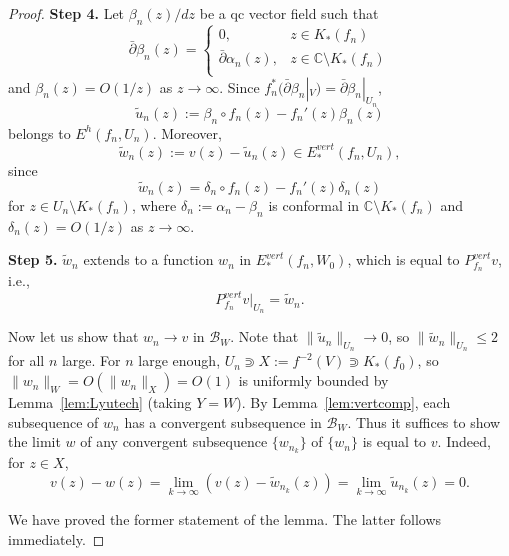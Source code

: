 \documentclass{amsart}
\numberwithin{equation}{section}
\newcommand{\C}{\mathbb C}
\theoremstyle{definition}
\theoremstyle{remark}
\begin{document}
\begin{proof}
{\bf Step 4.} Let $\beta_n(z)/dz$ be a qc vector field such that
\[ \bar{\partial} \beta_n(z)=
\begin{cases}
0, & z\in K_*(f_n)\\
\bar{\partial} \alpha_n(z),  & z\in \C \setminus K_*(f_n)\\
\end{cases}
\]
and $\beta_n(z)=O(1/z)$ as $z\to\infty$. Since $f_n^*(\bar{\partial} \beta_n|_V)=\bar{\partial} \beta_n|_{U_n}$,
$$\widetilde{u}_n(z):=\beta_n\circ f_n(z)-f_n'(z) \beta_n(z)$$
belongs to $E^h(f_n, U_n)$.
Moreover, 
$$\widetilde{w}_n(z):=v(z)-\widetilde{u}_n(z)\in E^{vert}_*(f_n, U_n),$$
since
\[\widetilde{w}_n(z)=\delta_n\circ f_n(z) - f_n'(z)\delta_n(z)
\]
for $z\in U_n\setminus K_*(f_n)$, where 
$\delta_n:=\alpha_n-\beta_n$ is conformal in $\mathbb{C}\setminus K_*(f_n)$ and $\delta_n(z)=O(1/z)$ as $z\to\infty$. 

{\bf Step 5.} $\widetilde{w}_n$ extends to a function $w_n$ in $E^{vert}_*(f_n,W_0)$, which is equal to $P^{vert}_{f_n}v$, i.e.,   
$$P^{vert}_{f_n}v|_{U_n}=\widetilde{w}_n.$$

Now let us show that $w_n\to v$ in $\mathcal{B}_{W}$. Note that $\|\widetilde{u}_n\|_{U_n}\to 0$, so $\|\widetilde{w}_n\|_{U_n}\le 2$ for all $n$ large. For $n$ large enough, $U_n\Supset X:=f^{-2}(V)\Supset K_*(f_0)$, so $\|w_n\|_{W}=O(\|w_n\|_{X})=O(1)$ is uniformly bounded by Lemma~\ref{lem:Lyutech} (taking $Y=W$). 
By Lemma~\ref{lem:vertcomp}, each subsequence of $w_n$ has a convergent subsequence in  $\mathcal{B}_W$. Thus it suffices to show the limit $w$ of any convergent subsequence $\{w_{n_k}\}$ of $\{w_n\}$ is equal to $v$. Indeed, for $z\in X$,
$$v(z)-w(z)=\lim_{k\to\infty} (v(z)-\widetilde{w}_{n_k}(z))=\lim_{k\to\infty} \widetilde{u}_{n_k}(z)=0.$$



We have proved the former statement of the lemma. The latter follows immediately. 
\end{proof}
\end{document}
